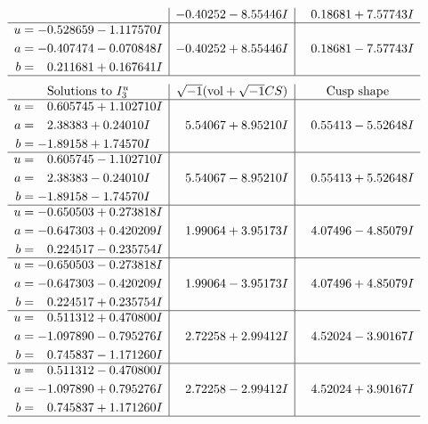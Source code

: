 \documentclass[1p]{elsarticle_modified}
\theoremstyle{definition}
\newcommand{\I}{\sqrt{-1}}
\begin{document}
$$\begin{array}{c|c|c}
 & -0.40252 - 8.55446 I & \phantom{-}0.18681 + 7.57743 I \\ \hline\begin{aligned}
u &= -0.528659 - 1.117570 I \\
a &= -0.407474 - 0.070848 I \\
b &= \phantom{-}0.211681 + 0.167641 I\end{aligned}
 & -0.40252 + 8.55446 I & \phantom{-}0.18681 - 7.57743 I\\
 \hline 
 \end{array}$$\newpage$$\begin{array}{c|c|c}  
\text{Solutions to }I^u_{3}& \I (\text{vol} + \sqrt{-1}CS) & \text{Cusp shape}\\
 \hline 
\begin{aligned}
u &= \phantom{-}0.605745 + 1.102710 I \\
a &= \phantom{-}2.38383 + 0.24010 I \\
b &= -1.89158 + 1.74570 I\end{aligned}
 & \phantom{-}5.54067 + 8.95210 I & \phantom{-}0.55413 - 5.52648 I \\ \hline\begin{aligned}
u &= \phantom{-}0.605745 - 1.102710 I \\
a &= \phantom{-}2.38383 - 0.24010 I \\
b &= -1.89158 - 1.74570 I\end{aligned}
 & \phantom{-}5.54067 - 8.95210 I & \phantom{-}0.55413 + 5.52648 I \\ \hline\begin{aligned}
u &= -0.650503 + 0.273818 I \\
a &= -0.647303 + 0.420209 I \\
b &= \phantom{-}0.224517 - 0.235754 I\end{aligned}
 & \phantom{-}1.99064 + 3.95173 I & \phantom{-}4.07496 - 4.85079 I \\ \hline\begin{aligned}
u &= -0.650503 - 0.273818 I \\
a &= -0.647303 - 0.420209 I \\
b &= \phantom{-}0.224517 + 0.235754 I\end{aligned}
 & \phantom{-}1.99064 - 3.95173 I & \phantom{-}4.07496 + 4.85079 I \\ \hline\begin{aligned}
u &= \phantom{-}0.511312 + 0.470800 I \\
a &= -1.097890 - 0.795276 I \\
b &= \phantom{-}0.745837 - 1.171260 I\end{aligned}
 & \phantom{-}2.72258 + 2.99412 I & \phantom{-}4.52024 - 3.90167 I \\ \hline\begin{aligned}
u &= \phantom{-}0.511312 - 0.470800 I \\
a &= -1.097890 + 0.795276 I \\
b &= \phantom{-}0.745837 + 1.171260 I\end{aligned}
 & \phantom{-}2.72258 - 2.99412 I & \phantom{-}4.52024 + 3.90167 I\\
 \hline 
 \end{array}$$\newpage
\end{document}
